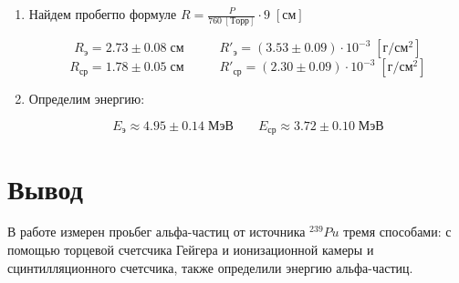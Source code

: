 \documentclass[a4paper]{article}
\begin{document}
\begin{enumerate}
    \item Найдем пробегпо формуле $R = \frac{P}{760\; [Торр]} \cdot 9 \; [см]$
    
    $$R_э = 2.73 \pm 0.08 \; см \;\;\;\;\;\;\;\;\;\; R'_э = (3.53 \pm 0.09) \cdot 10^{-3} \; [г/см^2]$$
    $$R_{ср} = 1.78 \pm 0.05 \; см \;\;\;\;\;\;\;\;\;\; R'_{ср} = (2.30 \pm 0.09) \cdot 10^{-3} \; [г/см^2]$$


    \item Определим энергию:
    
    $$E_{э} \approx 4.95 \pm 0.14 \; МэВ \;\;\;\;\;\;\; E_{ср} \approx 3.72 \pm 0.10 \; МэВ$$
\end{enumerate}



\section{Вывод}

В работе измерен проьбег альфа-частиц от источника $^{239}Pu$ тремя способами: с помощью торцевой счетсчика Гейгера и
ионизационной камеры и сцинтилляционного счетсчика, также определили энергию альфа-частиц. 
\end{document}
